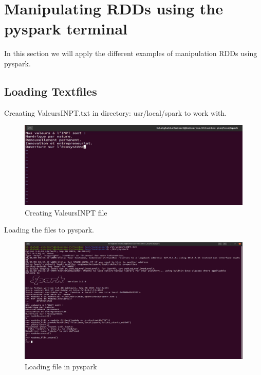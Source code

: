 \chapter{Manipulating RDDs using the pyspark terminal}
\par In this section we will apply the different examples of manipulation RDDs using pyspark.
\begin{spacing}{1.2}
\section{Loading Textfiles}

\par Creaating ValeursINPT.txt in directory: usr/local/spark to work with.
\\
\begin{figure}[!htb] 
\begin{center} 
\includegraphics[width=1\linewidth]{Big_Data/Spark/Manipulating RDDs using pyspark/Creating ValeursINPT file} 
\end{center} 
\caption{Creating ValeursINPT file} 
\end{figure} 
\FloatBarrier



\par Loading the files to pyspark.
\\
\begin{figure}[!htb] 
\begin{center} 
\includegraphics[width=1\linewidth]{Big_Data/Spark/Manipulating RDDs using pyspark/Loading file in pyspark} 
\end{center} 
\caption{Loading file in pyspark} 
\end{figure} 
\FloatBarrier


\end{spacing}
